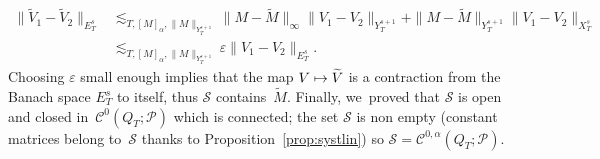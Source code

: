 \documentclass[10pt]{amsart}
\newcommand\mto{\mathchoice{\longmapsto}{\mapsto}{\mapsto}{\mapsto}}
\theoremstyle{definition}
\let\ep\varepsilon
\begin{document}
\begin{align*}
\|\widetilde{V}_1-\widetilde{V}_{2}\|_{E_T^s} &\lesssim_{T,[M]_\alpha,\|M\|_{Y_T^{s+1}}} \|M\!-\!\widetilde{M}\|_\infty \|V_1\!-\!V_2\|_{Y_T^{s+1}} + \|M\!-\!\widetilde{M}\|_{Y_T^{s+1}} \|V_1\!-\!V_2\|_{X_T^s}\\
&\lesssim_{T,[M]_\alpha,\|M\|_{Y_T^{s+1}}} \ep \|V_1-V_2\|_{E_T^s}.
\end{align*}
Choosing $\ep$ small enough implies that the map $V\mto \widetilde{V}$ is a contraction from the Banach space $E_T^s$ to itself, thus $\mathscr{S}$ contains~$\widetilde{M}$. Finally, we~proved that $\mathscr{S}$ is open and closed in~$\mathscr{C}^0(Q_T;\mathscr{P})$ which is connected; the set $\mathscr{S}$ is non empty (constant matrices belong to~$\mathscr{S}$ thanks to Proposition~\ref{prop:systlin}) so $\mathscr{S}=\mathscr{C}^{0,\alpha}(Q_T;\mathscr{P})$.
\end{document}
